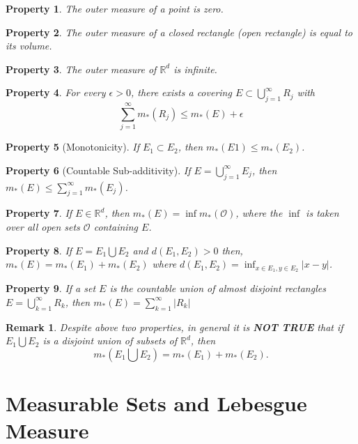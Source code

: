 \documentclass{report}
\theoremstyle{upthm}
\newtheorem{remark}{Remark}
\newtheorem{property}{Property}
\newcommand{\reals}{\mathbb{R}}
\newcommand{\calO}{{\mathcal{O}}}
\newcommand{\union}{\bigcup}
\newcommand{\vl}{\Big|}
\begin{document}
\begin{property}
	The outer measure of a point is zero.
\end{property}
\begin{property}
	The outer measure of a closed rectangle (open rectangle) is equal to its volume.
\end{property}
\begin{property}
	The outer measure of $\reals^d$ is infinite.
\end{property}
\begin{property}
	For every $\epsilon > 0$, there exists a covering $E \subset \union_{j=1}^{\infty} R_j$  with
	$$ \sum_{j=1}^{\infty} m_*(R_j) \leq m_*(E) + \epsilon $$
\end{property}
\begin{property}[Monotonicity]
	If $E_1 \subset E_2$, then $m_*(E1) \leq m_*(E_2)$.
\end{property}

\begin{property}[Countable Sub-additivity]
	If $E = \union_{j=1}^{\infty} E_j $, then $ m_*(E) \leq \sum_{j=1}^{\infty} m_*(E_j)$.
\end{property}

\begin{property}
	If $E \in \reals^d$, then $m_*(E) = \inf m_*(\calO)$, where the $\inf$ is taken over all open sets $\calO$ containing $E$.
\end{property}

\begin{property}
	If $E = E_1 \union E_2$ and $d(E_1, E_2) > 0$ then, $m_*(E) = m_*(E_1) + m_*(E_2)$ where $d(E_1, E_2) = \inf_{x \in E_1, y \in E_2} \vl x - y \vl$. 
\end{property}

\begin{property}
	If a set $E$ is the countable union of almost disjoint rectangles $ E = \union_{k=1}^{\infty} R_k $, then $m_*(E) = \sum_{k=1}^{\infty} \vl R_k \vl$
\end{property}

\begin{remark}
	Despite above two properties, in general it is {\bf NOT TRUE} that if $E_1 \union E_2$ is a disjoint union of subsets of $\reals^d$, then
	$$ m_*(E_1 \union E_2) = m_*(E_1) + m_*(E_2) .$$
\end{remark}

\section{Measurable Sets and Lebesgue Measure}
\end{document}
